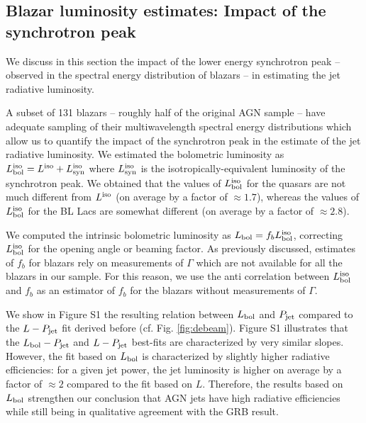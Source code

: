 \documentclass[12pt]{article}
\begin{document}
\subsection*{Blazar luminosity estimates: Impact of the synchrotron peak}

We discuss in this section the impact of the lower energy synchrotron peak -- observed in the spectral energy distribution of blazars \cite{sfossati98,sdonato01} -- in estimating the jet radiative luminosity. 

A subset of 131 blazars -- roughly half of the original AGN sample -- have adequate sampling of their multiwavelength spectral energy distributions which allow us to quantify the impact of the synchrotron peak in the estimate of the jet radiative luminosity. We estimated the bolometric luminosity as $L_{\rm bol}^{\rm iso}=L^{\rm iso}+L_{\rm syn}^{\rm iso}$ where $L_{\rm syn}^{\rm iso}$ is the isotropically-equivalent luminosity of the synchrotron peak. We obtained that the values of $L_{\rm bol}^{\rm iso}$ for the quasars are not much different from $L^{\rm iso}$ (on average by a factor of $\approx 1.7$), whereas the values of $L_{\rm bol}^{\rm iso}$ for the BL Lacs are somewhat different (on average by a factor of $\approx 2.8$).

We computed the intrinsic bolometric luminosity as $L_{\rm bol}=f_b L_{\rm bol}^{\rm iso}$,  correcting $L_{\rm bol}^{\rm iso}$ for the opening angle or beaming factor. As previously discussed, estimates of $f_b$ for blazars rely on measurements of $\Gamma$ which are not available for all the blazars in our sample. For this reason, we use the anti correlation between $L_{\rm bol}^{\rm iso}$ and $f_b$ as an estimator of $f_b$ for the blazars without measurements of $\Gamma$.

We show in Figure S1 the resulting relation between $L_{\rm bol}$ and $P_{\rm jet}$ compared to the $L - P_{\rm jet}$ fit derived before (cf. Fig. \ref{fig:debeam}). Figure S1 illustrates that the $L_{\rm bol} - P_{\rm jet}$ and $L - P_{\rm jet}$ best-fits are characterized by very similar slopes. However, the fit based on $L_{\rm bol}$ is characterized by slightly higher radiative efficiencies: for a given jet power, the jet luminosity is higher on average by a factor of $\approx 2$ compared to the fit based on $L$. 
%
Therefore, the results based on $L_{\rm bol}$ strengthen our conclusion that AGN jets have high radiative efficiencies while still being in qualitative agreement with the GRB result. 
\end{document}
